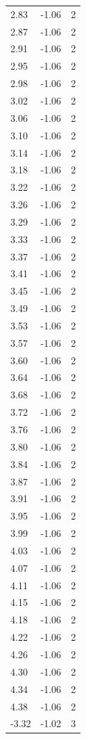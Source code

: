 \begin{longtable}{lrr}
  2.83 & -1.06 & 2 \\
  2.87 & -1.06 & 2 \\
  2.91 & -1.06 & 2 \\
  2.95 & -1.06 & 2 \\
  2.98 & -1.06 & 2 \\
  3.02 & -1.06 & 2 \\
  3.06 & -1.06 & 2 \\
  3.10 & -1.06 & 2 \\
  3.14 & -1.06 & 2 \\
  3.18 & -1.06 & 2 \\
  3.22 & -1.06 & 2 \\
  3.26 & -1.06 & 2 \\
  3.29 & -1.06 & 2 \\
  3.33 & -1.06 & 2 \\
  3.37 & -1.06 & 2 \\
  3.41 & -1.06 & 2 \\
  3.45 & -1.06 & 2 \\
  3.49 & -1.06 & 2 \\
  3.53 & -1.06 & 2 \\
  3.57 & -1.06 & 2 \\
  3.60 & -1.06 & 2 \\
  3.64 & -1.06 & 2 \\
  3.68 & -1.06 & 2 \\
  3.72 & -1.06 & 2 \\
  3.76 & -1.06 & 2 \\
  3.80 & -1.06 & 2 \\
  3.84 & -1.06 & 2 \\
  3.87 & -1.06 & 2 \\
  3.91 & -1.06 & 2 \\
  3.95 & -1.06 & 2 \\
  3.99 & -1.06 & 2 \\
  4.03 & -1.06 & 2 \\
  4.07 & -1.06 & 2 \\
  4.11 & -1.06 & 2 \\
  4.15 & -1.06 & 2 \\
  4.18 & -1.06 & 2 \\
  4.22 & -1.06 & 2 \\
  4.26 & -1.06 & 2 \\
  4.30 & -1.06 & 2 \\
  4.34 & -1.06 & 2 \\
  4.38 & -1.06 & 2 \\
  -3.32 & -1.02 & 3 \\

\end{longtable}
